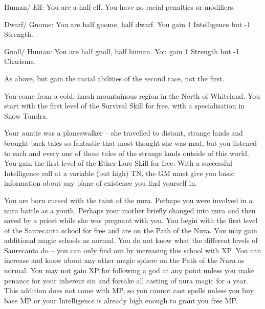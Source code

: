\begin{multicols}{2}
\begin{list}{\addtocounter{list}{1}\textbf{:}}{\raggedleft}
		\setcounter{enc}{1}
		\begin{list}{\addtocounter{enc}{1}-\addtocounter{enc}{1}:}{}
			\item{Human/ Elf: You are a half-elf.  You have no racial penalties or modifiers.}

			\item{Dwarf/ Gnome: You are half gnome, half dwarf.  You gain 1 Intelligence but -1 Strength.}

			\item{Gnoll/ Human: You are half gnoll, half human.  You gain 1 Strength but -1 Charisma.}
		\end{list}

\item{As above, but gain the racial abilities of the second race, not the first.}

\item{You come from a cold, harsh mountainous region in the North of Whiteland.  You start with the first level of the Survival Skill for free, with a specialisation in Snow Tundra.}

\item{Your auntie was a planeswalker -- she travelled to distant, strange lands and brought back tales so fantastic that most thought she was mad, but you listened to each and every one of those tales of the strange lands outside of this world.  You gain the first level of the Ether Lore Skill for free.  With a successful Intelligence roll at a variable (but high) TN, the GM must give you basic information about any plane of existence you find yourself in.}

\item{You are born cursed with the taint of the nura.  Perhaps you were involved in a nura battle as a youth.  Perhaps your mother briefly changed into nura and then saved by a priest while she was pregnant with you.  You begin with the first level of the Saurecanta school for free and are on the Path of the Nura.  You may gain additional magic schools as normal.  You do not know what the different levels of Saurecanta do -- you can only find out by increasing this school with XP.  You can increase and know about any other magic sphere on the Path of the Nura as normal.  You may not gain XP for following a god at any point unless you make penance for your inherent sin and forsake all casting of nura magic for a year.  This addition does not come with MP, so you cannot cast spells unless you buy base MP or your Intelligence is already high enough to grant you free MP.}


\end{list}
\end{multicols}
